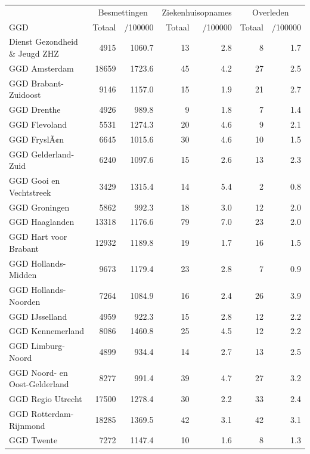 \documentclass[
  english,
  man,floatsintext]{apa6}
\begin{document}
\begin{table}
\centering\begingroup\fontsize{10}{12}\selectfont

\begin{threeparttable}
\begin{tabular}{lrrrrrr}
\toprule
\multicolumn{1}{c}{ } & \multicolumn{2}{c}{Besmettingen} & \multicolumn{2}{c}{Ziekenhuisopnames} & \multicolumn{2}{c}{Overleden} \\
\cmidrule(l{3pt}r{3pt}){2-3} \cmidrule(l{3pt}r{3pt}){4-5} \cmidrule(l{3pt}r{3pt}){6-7}
GGD & Totaal & /100000 & Totaal & /100000 & Totaal & /100000\\
\midrule
Dienst Gezondheid \& Jeugd ZHZ & 4915 & 1060.7 & 13 & 2.8 & 8 & 1.7\\
GGD Amsterdam & 18659 & 1723.6 & 45 & 4.2 & 27 & 2.5\\
GGD Brabant-Zuidoost & 9146 & 1157.0 & 15 & 1.9 & 21 & 2.7\\
GGD Drenthe & 4926 & 989.8 & 9 & 1.8 & 7 & 1.4\\
GGD Flevoland & 5531 & 1274.3 & 20 & 4.6 & 9 & 2.1\\
GGD FryslÃ¢n & 6645 & 1015.6 & 30 & 4.6 & 10 & 1.5\\
GGD Gelderland-Zuid & 6240 & 1097.6 & 15 & 2.6 & 13 & 2.3\\
GGD Gooi en Vechtstreek & 3429 & 1315.4 & 14 & 5.4 & 2 & 0.8\\
GGD Groningen & 5862 & 992.3 & 18 & 3.0 & 12 & 2.0\\
GGD Haaglanden & 13318 & 1176.6 & 79 & 7.0 & 23 & 2.0\\
GGD Hart voor Brabant & 12932 & 1189.8 & 19 & 1.7 & 16 & 1.5\\
GGD Hollands-Midden & 9673 & 1179.4 & 23 & 2.8 & 7 & 0.9\\
GGD Hollands-Noorden & 7264 & 1084.9 & 16 & 2.4 & 26 & 3.9\\
GGD IJsselland & 4959 & 922.3 & 15 & 2.8 & 12 & 2.2\\
GGD Kennemerland & 8086 & 1460.8 & 25 & 4.5 & 12 & 2.2\\
GGD Limburg-Noord & 4899 & 934.4 & 14 & 2.7 & 13 & 2.5\\
GGD Noord- en Oost-Gelderland & 8277 & 991.4 & 39 & 4.7 & 27 & 3.2\\
GGD Regio Utrecht & 17500 & 1278.4 & 30 & 2.2 & 33 & 2.4\\
GGD Rotterdam-Rijnmond & 18285 & 1369.5 & 42 & 3.1 & 42 & 3.1\\
GGD Twente & 7272 & 1147.4 & 10 & 1.6 & 8 & 1.3\\

\end{tabular}
\end{threeparttable}
\end{table}
\end{document}
